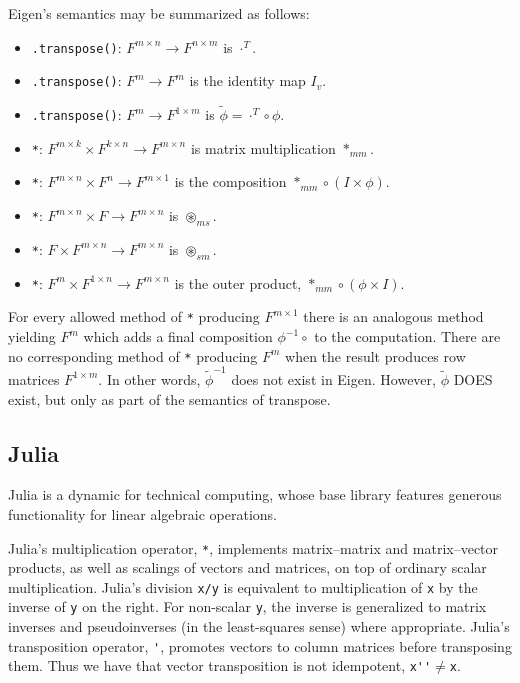 Eigen's semantics may be summarized as follows:
\begin{itemize}
\item \verb`.transpose()`: $F^{m\times n}\rightarrow F^{n\times m}$ is
$\cdot^{T}$.
\item \verb`.transpose()`: $F^{m}\rightarrow F^{m}$ is the identity map
$I_{v}$.
\item \verb`.transpose()`: $F^{m}\rightarrow F^{1\times m}$ is $\tilde{\phi}=\cdot^{T}\circ\phi$.
\item \verb`*`: $F^{m\times k}\times F^{k\times n}\rightarrow F^{m\times n}$
is matrix multiplication $*_{mm}$.
\item \verb`*`: $F^{m\times n}\times F^{n}\rightarrow F^{m\times1}$ is
the composition $*_{mm}\circ\left(I\times\phi\right)$.
\item \verb`*`: $F^{m\times n}\times F\rightarrow F^{m\times n}$ is $\circledast_{ms}$.
\item \verb`*`: $F\times F^{m\times n}\rightarrow F^{m\times n}$ is $\circledast_{sm}$.
\item \verb`*`: $F^{m}\times F^{1\times n}\rightarrow F^{m\times n}$ is
the outer product, $*_{mm}\circ\left(\phi\times I\right)$.
\end{itemize}
For every allowed method of \verb`*` producing $F^{m\times1}$ there
is an analogous method yielding $F^{m}$ which adds a final composition
$\phi^{-1}\circ$ to the computation. There are no corresponding method
of \verb`*` producing $F^{m}$ when the result produces row matrices
$F^{1\times m}$. In other words, $\tilde{\phi}^{-1}$ does not exist
in Eigen. However, $\tilde{\phi}$ DOES exist, but only as part of
the semantics of transpose.

\subsection{Julia}

Julia is a dynamic for technical computing, whose base library features
generous functionality for linear algebraic operations.~\cite{Bezanson2012}

Julia's multiplication operator, \verb`*`, implements matrix–matrix
and matrix–vector products, as well as scalings of vectors and matrices,
on top of ordinary scalar multiplication. Julia's division \verb`x/y`
is equivalent to multiplication of \verb`x` by the inverse of \verb`y`
on the right. For non-scalar \verb`y`, the inverse is generalized
to matrix inverses and pseudoinverses (in the least-squares sense)
where appropriate. Julia's transposition operator, \verb`'`, promotes
vectors to column matrices before transposing them. Thus we have that
vector transposition is not idempotent, \verb`x''`$\ne$\verb`x`.

